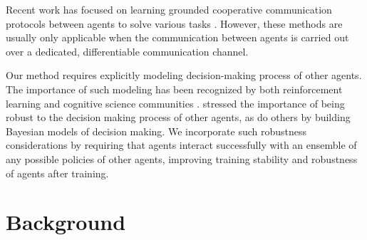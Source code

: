 \documentclass{article}
\newcommand{\comment}[1]{\textbf{\textcolor{red}{comment: #1}}}
\begin{document}
\nocite{thomas2011conjugate}

Recent work has focused on learning grounded cooperative communication protocols between agents to solve various tasks \cite{sukhbaatar2016learning,foerster16b,mordatch2017emergence}. However, these methods are usually only applicable when the communication between agents is carried out over a dedicated, differentiable communication channel. 



Our method requires explicitly modeling decision-making process of other agents. The importance of such modeling has been recognized by both reinforcement learning \cite{boutilier96,boutilier03} and cognitive science communities \cite{frank_rsa}. \cite{hu98} stressed the importance of being robust to the decision making process of other agents, as do others by building Bayesian models of decision making. We incorporate such robustness considerations by requiring that agents interact successfully with an ensemble of any possible policies of other agents, improving training stability and robustness of agents after training. 



\section{Background}
\label{sec:background}
\end{document}
